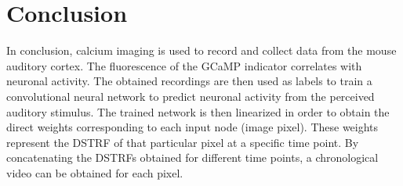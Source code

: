 \section{Conclusion}
In conclusion, calcium imaging is used to record and collect data from the mouse auditory cortex. The fluorescence of the GCaMP indicator correlates with neuronal activity. The obtained recordings are then used as labels to train a convolutional neural network to predict neuronal activity from the perceived auditory stimulus. The trained network is then linearized in order to obtain the direct weights corresponding to each input node (image pixel). These weights represent the DSTRF of that particular pixel at a specific time point. By concatenating the DSTRFs obtained for different time points, a chronological video can be obtained for each pixel.